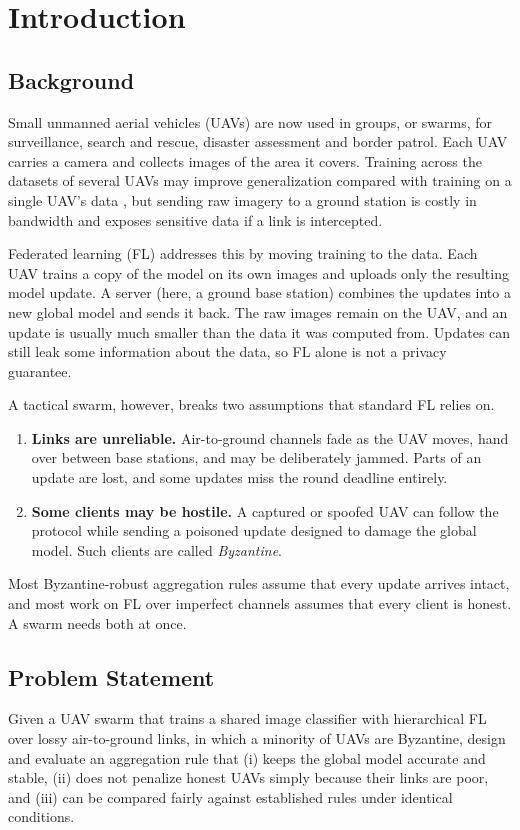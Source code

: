 \chapter{Introduction}
\thispagestyle{plain}
\label{ch:intro}

\section{Background}
Small unmanned aerial vehicles (UAVs) are now used in groups, or swarms, for
surveillance, search and rescue, disaster assessment and border patrol. Each UAV
carries a camera and collects images of the area it covers. Training across the
datasets of several UAVs may improve generalization compared with training on a
single UAV's data \cite{mcmahan2017fedavg}, but sending raw imagery to a ground
station is costly in bandwidth and exposes sensitive data if a link is intercepted.

Federated learning (FL) addresses this by moving training to the data. Each UAV
trains a copy of the model on its own images and uploads only the resulting model
update. A server (here, a ground base station) combines the updates into a new
global model and sends it back. The raw images remain on the UAV, and an update is
usually much smaller than the data it was computed from. Updates can still leak some
information about the data, so FL alone is not a privacy guarantee.

A tactical swarm, however, breaks two assumptions that standard FL relies on.
\begin{enumerate}
\item \textbf{Links are unreliable.} Air-to-ground channels fade as the UAV moves,
  hand over between base stations, and may be deliberately jammed. Parts of an update
  are lost, and some updates miss the round deadline entirely.
\item \textbf{Some clients may be hostile.} A captured or spoofed UAV can follow the
  protocol while sending a poisoned update designed to damage the global model. Such
  clients are called \emph{Byzantine}.
\end{enumerate}
Most Byzantine-robust aggregation rules assume that every update arrives intact, and
most work on FL over imperfect channels assumes that every client is honest. A swarm
needs both at once.

\section{Problem Statement}
Given a UAV swarm that trains a shared image classifier with hierarchical FL over
lossy air-to-ground links, in which a minority of UAVs are Byzantine, design and
evaluate an aggregation rule that (i) keeps the global model accurate and stable,
(ii) does not penalize honest UAVs simply because their links are poor, and
(iii) can be compared fairly against established rules under identical conditions.

